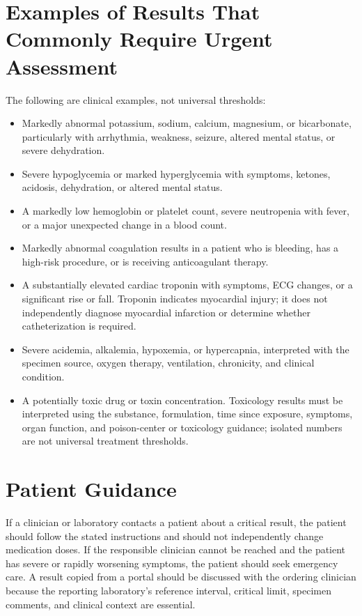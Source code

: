 \section{Examples of Results That Commonly Require Urgent Assessment}

The following are clinical examples, not universal thresholds:
\begin{itemize}
    \item Markedly abnormal potassium, sodium, calcium, magnesium, or bicarbonate, particularly with arrhythmia, weakness, seizure, altered mental status, or severe dehydration.
    \item Severe hypoglycemia or marked hyperglycemia with symptoms, ketones, acidosis, dehydration, or altered mental status.
    \item A markedly low hemoglobin or platelet count, severe neutropenia with fever, or a major unexpected change in a blood count.
    \item Markedly abnormal coagulation results in a patient who is bleeding, has a high-risk procedure, or is receiving anticoagulant therapy.
    \item A substantially elevated cardiac troponin with symptoms, ECG changes, or a significant rise or fall. Troponin indicates myocardial injury; it does not independently diagnose myocardial infarction or determine whether catheterization is required.
    \item Severe acidemia, alkalemia, hypoxemia, or hypercapnia, interpreted with the specimen source, oxygen therapy, ventilation, chronicity, and clinical condition.
    \item A potentially toxic drug or toxin concentration. Toxicology results must be interpreted using the substance, formulation, time since exposure, symptoms, organ function, and poison-center or toxicology guidance; isolated numbers are not universal treatment thresholds.
\end{itemize}

\section{Patient Guidance}

If a clinician or laboratory contacts a patient about a critical result, the patient should follow the stated instructions and should not independently change medication doses. If the responsible clinician cannot be reached and the patient has severe or rapidly worsening symptoms, the patient should seek emergency care. A result copied from a portal should be discussed with the ordering clinician because the reporting laboratory's reference interval, critical limit, specimen comments, and clinical context are essential.

